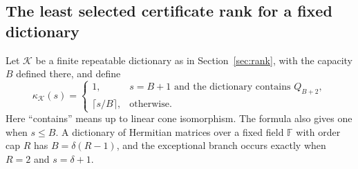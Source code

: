 \subsection{The least selected certificate rank for a fixed dictionary}
Let $\mathscr K$ be a finite repeatable dictionary as in
Section~\ref{sec:rank}, with the capacity $B$ defined there, and define
\begin{equation}\label{eq:smooth-kappa}
 \kappa_{\mathscr K}(s)=
 \begin{cases}
 1,&s=B+1\text{ and the dictionary contains }Q_{B+2},\\
 \lceil s/B\rceil,&\text{otherwise}.
 \end{cases}
\end{equation}
Here ``contains'' means up to linear cone isomorphism. The
formula also gives one when $s\leq B$. A dictionary of Hermitian matrices over a fixed field
$\mathbb F$ with order cap $R$ has $B=\delta(R-1)$, and the exceptional
branch occurs exactly when $R=2$ and $s=\delta+1$.

